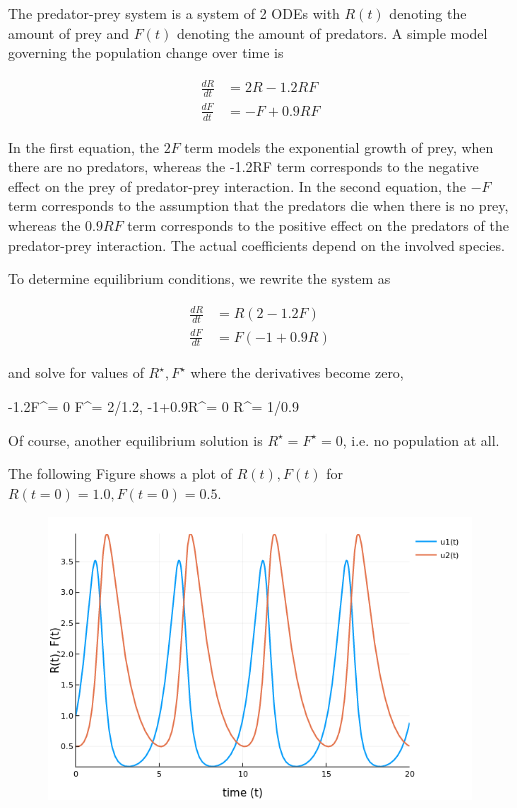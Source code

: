 
The predator-prey system is a system of 2 ODEs with $R(t)$ denoting the amount of prey and $F(t)$ denoting the amount of predators. A simple model governing the population change over time is

\begin{align*}
\frac{dR}{dt} &= 2R - 1.2RF \\
\frac{dF}{dt} &= -F + 0.9RF
\end{align*}

In the first equation, the $2F$ term models the exponential growth of prey, when there are no predators, whereas the -1.2RF term corresponds to the negative effect on the prey of predator-prey interaction. In the second equation, the $-F$ term corresponds to the assumption that the predators die when there is no prey, whereas the $0.9RF$ term corresponds to the positive effect on the predators of the predator-prey interaction. The actual coefficients depend on the involved species.

To determine equilibrium conditions, we rewrite the system as

\begin{align*}
\frac{dR}{dt} &= R (2 - 1.2F) \\
\frac{dF}{dt} &= F(-1 + 0.9R)
\end{align*}

and solve for values of $R^\star,F^\star$ where the derivatives become zero,

-1.2F^\star= 0 \rightarrow F^\star = 2/1.2, -1+0.9R^\star = 0 \rightarrow R^\star  = 1/0.9
\eee

Of course, another equilibrium solution is $R^\star= F^\star = 0$, i.e. no population at all.

The following Figure shows a plot of $R(t), F(t)$ for $R(t=0) = 1.0, F(t=0) = 0.5$.

\begin{figure}[H]
	\includegraphics[scale=0.65]{images/ode_04_01.png}
\end{figure}

